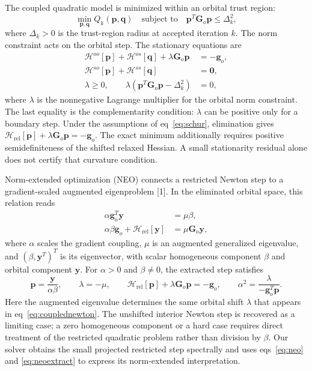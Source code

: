 \documentclass[12pt]{article}
\begin{document}
The coupled quadratic model is minimized within an orbital trust region:
\begin{equation}
 \min_{\mathbf p,\mathbf q}Q_k(\mathbf p,\mathbf q)
 \quad\text{subject to}\quad \mathbf p^T\mathbf G_o\mathbf p\leq\Delta_k^2,
 \label{eq:trust}
\end{equation}
where \(\Delta_k>0\) is the trust-region radius at accepted iteration \(k\). The norm constraint acts on the orbital step. The stationary equations are
\begin{equation}
 \begin{aligned}
 \mathcal H^{oo}[\mathbf p]+\mathcal H^{os}[\mathbf q]
       +\lambda\mathbf G_o\mathbf p&=-\mathbf g_o,\\
 \mathcal H^{so}[\mathbf p]+\mathcal H^{ss}[\mathbf q]&=\mathbf0,\\
 \lambda\geq0,\qquad \lambda(\mathbf p^T\mathbf G_o\mathbf p-\Delta_k^2)&=0,
 \end{aligned}
 \label{eq:couplednewton}
\end{equation}
where \(\lambda\) is the nonnegative Lagrange multiplier for the orbital norm constraint. The last equality is the complementarity condition: \(\lambda\) can be positive only for a boundary step. Under the assumptions of eq~\eqref{eq:schur}, elimination gives
\(\mathcal H_{\mathrm{rel}}[\mathbf p]+\lambda\mathbf G_o\mathbf p=-\mathbf g_o\).
The exact minimum additionally requires positive semidefiniteness of the shifted relaxed Hessian. A small stationarity residual alone does not certify that curvature condition.

Norm-extended optimization (NEO) connects a restricted Newton step to a gradient-scaled augmented eigenproblem [1]. In the eliminated orbital space, this relation reads
\begin{equation}
 \begin{aligned}
 \alpha\mathbf g_o^T\mathbf y&=\mu\beta,\\
 \alpha\beta\mathbf g_o+\mathcal H_{\mathrm{rel}}[\mathbf y]
       &=\mu\mathbf G_o\mathbf y,
 \end{aligned}
 \label{eq:neo}
\end{equation}
where \(\alpha\) scales the gradient coupling, \(\mu\) is an augmented generalized eigenvalue, and \((\beta,\mathbf y^T)^T\) is its eigenvector, with scalar homogeneous component \(\beta\) and orbital component \(\mathbf y\). For \(\alpha>0\) and \(\beta\neq0\), the extracted step satisfies
\begin{equation}
 \mathbf p=\frac{\mathbf y}{\alpha\beta},\qquad
 \lambda=-\mu,\qquad
 \mathcal H_{\mathrm{rel}}[\mathbf p]+\lambda\mathbf G_o\mathbf p=-\mathbf g_o,
 \qquad \alpha^2=\frac{\lambda}{-\mathbf g_o^T\mathbf p}.
 \label{eq:neoextract}
\end{equation}
Here the augmented eigenvalue determines the same orbital shift \(\lambda\) that appears in eq~\eqref{eq:couplednewton}. The unshifted interior Newton step is recovered as a limiting case; a zero homogeneous component or a hard case requires direct treatment of the restricted quadratic problem rather than division by \(\beta\). Our solver obtains the small projected restricted step spectrally and uses eqs~\eqref{eq:neo} and \eqref{eq:neoextract} to express its norm-extended interpretation.
\end{document}

